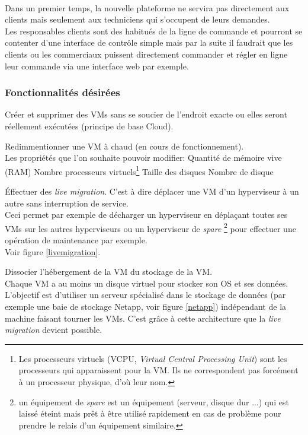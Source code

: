 \paragraph*{}
Dans un premier temps, la nouvelle plateforme ne servira pas directement aux clients mais seulement aux techniciens  qui s'occupent de leurs demandes.\\
Les responsables clients sont des habitués de la ligne de commande et pourront se contenter d'une interface de contrôle simple mais par la suite
il faudrait que les clients ou les commerciaux puissent directement commander et régler en ligne leur commande via une interface web par exemple.

\subsubsection{Fonctionnalités désirées}

\begin{listi}
	\item Créer et supprimer des VMs sans se soucier de l'endroit exacte ou elles seront réellement exécutées (principe de base Cloud).
	\item Redimmentionner une VM à chaud (en cours de fonctionnement).\\
		Les propriétés que l'on souhaite pouvoir modifier:
		\subitem Quantité de mémoire vive (RAM)
		\subitem Nombre processeurs virtuels\footnote{Les processeurs virtuels (VCPU, \emph{Virtual Central Processing Unit}) sont les processeurs qui apparaissent
			pour la VM. Ils ne correspondent pas forcément à un processeur physique, d'où leur nom.}
		\subitem Taille des disques
		\subitem Nombre de disque
	\item Éffectuer des \emph{live migration}. C'est à dire déplacer une VM d'un hyperviseur à un autre sans interruption de service.\\
		Ceci permet par exemple de décharger un hyperviseur en déplaçant toutes ses VMs sur les autres hyperviseurs ou un hyperviseur de \emph{spare}
		\footnote{un équipement de \emph{spare} est un équipement (serveur, disque dur ...) qui est laissé éteint mais prêt à être utilisé rapidement
		en cas de problème pour prendre le relais d'un équipement similaire.} pour effectuer une opération de maintenance par exemple.
		\\
		Voir figure \ref{livemigration}.
	\item Dissocier l'hébergement de la VM du stockage de la VM.\\
		Chaque VM a au moins un disque virtuel pour stocker son OS et ses données. L'objectif est d'utiliser un serveur spécialisé dans le stockage de données
		(par exemple une baie de stockage Netapp, voir figure \ref{netapp}) indépendant de la machine faisant tourner les VMs. C'est grâce à cette architecture que
		la \emph{live migration} devient possible.
\end{listi}

